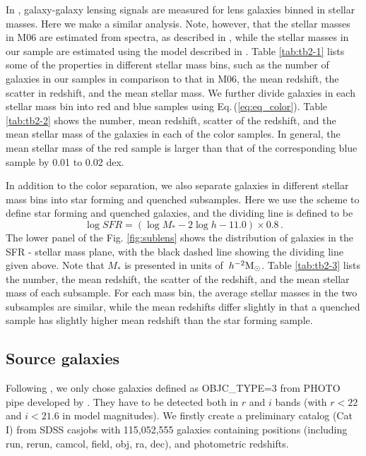\documentclass[apj]{emulateapj}
\newcommand{\msunhh}{\>h^{-2}\rm M_\odot}
\begin{document}
In \citet[herefater M06]{Mandelbaum2006}, galaxy-galaxy 
lensing signals are measured for lens galaxies binned in stellar
masses. Here we make a similar analysis.  Note, however, 
that the stellar masses in M06 are estimated from spectra, as
described in \citet{Kauffmann2003}, while the stellar masses in 
our sample are estimated using the model described 
in \citet{Bell2003}. Table \ref{tab:tb2-1} lists some of the properties 
in different stellar mass bins, such as the number of galaxies in 
our samples in comparison to that in M06, the mean redshift,
the scatter in redshift, and the mean stellar mass.
We further divide galaxies in each stellar mass bin into 
red and blue samples using  Eq.\,(\ref{eq:eq_color}). 
Table \ref{tab:tb2-2} shows the number, mean redshift, scatter of the
redshift, and the mean stellar mass of the galaxies in each of the 
color samples. In general, the mean stellar mass of the red sample 
is larger than that of the corresponding blue sample by 0.01 to 0.02 dex.

In addition to the color separation, we also separate galaxies in
different stellar mass bins into star forming and quenched
subsamples. Here we use the \citet{Yang2013, Luo2014} scheme to 
define star forming and quenched galaxies, and the dividing line 
is defined to be
\begin{equation}
\log SFR=(\log M_* -2\log h -11.0)\times 0.8\,.
\label{eq:eq_sf_qu}
\end{equation}
The lower panel of the
Fig. \ref{fig:sublens} shows the distribution of galaxies in the SFR -
stellar mass plane, with the black dashed line showing the dividing line 
given above. Note that $M_*$ is presented in units of $\msunhh$.  Table
\ref{tab:tb2-3} lists the number, the mean redshift, the scatter of
the redshift, and the mean stellar mass of each subsample.  
For each mass bin,  the average stellar masses in the two  
subsamples are similar,  while the mean redshifts differ slightly 
in that a quenched sample has slightly higher mean redshift 
than the star forming sample.

\subsection{Source galaxies}

Following \citet[][hereafter M05]{Mandelbaum2005}, we only chose
galaxies defined as OBJC\_TYPE=3 from PHOTO pipe developed by
\citet{Lupton2001}. They have to be detected both in $r$ and $i$ bands
(with $r<22$ and $i<21.6$ in model magnitudes). We firstly create a
preliminary catalog (Cat I) from SDSS casjobs with 115,052,555
galaxies containing positions (including run, rerun, camcol, field,
obj, ra, dec), and photometric redshifts.
\end{document}
